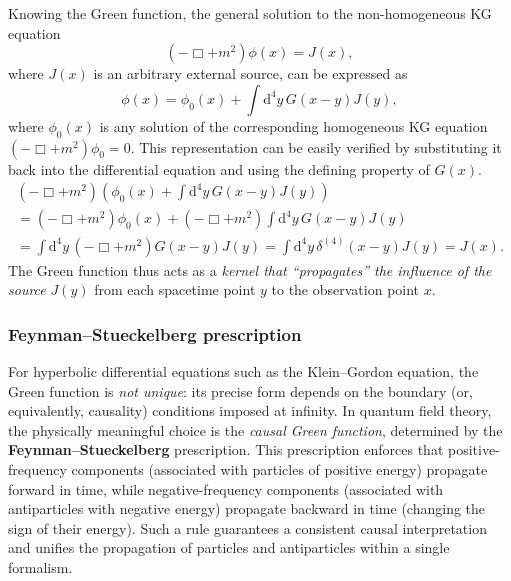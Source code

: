 Knowing the Green function, the general solution to the non-homogeneous KG equation
\begin{equation}
    (-\Box + m^2)\phi(x) = J(x),
    \label{eq:KG_inhomogeneous}
\end{equation}
where \(J(x)\) is an arbitrary external source, can be expressed as
\begin{equation}
    \phi(x) = \phi_0(x) + \int \mathrm{d}^4 y \, G(x - y) J(y),
    \label{eq:KG_solution_GF}
\end{equation}
where \(\phi_0(x)\) is any solution of the corresponding homogeneous KG equation \((-\Box + m^2)\phi_0 = 0\).
This representation can be easily verified by substituting it back into the differential equation and using the defining property of \(G(x)\).
\[
    \begin{aligned}
        (-\Box + m^2)\left( \phi_0(x) + \int \mathrm{d}^4 y \, G(x - y) J(y) \right) \\ =(-\Box + m^2)\phi_0(x) + (-\Box + m^2)\int \mathrm{d}^4 y \, G(x - y) J(y) \\
        = \int \mathrm{d}^4 y \, (-\Box + m^2) G(x - y) J(y) = \int \mathrm{d}^4 y \, \delta^{(4)}(x - y) J(y) = J(x).
    \end{aligned}
\]
The Green function thus acts as a \textit{kernel that ``propagates'' the influence of the source} \(J(y)\) from each spacetime point \(y\) to the observation point \(x\).

\subsubsection{Feynman--Stueckelberg prescription}

For hyperbolic differential equations such as the Klein--Gordon equation, the Green function is \textit{not unique}: its precise form depends on the boundary (or, equivalently, causality) conditions imposed at infinity.
In quantum field theory, the physically meaningful choice is the \textit{causal Green function}, determined by the \textbf{Feynman--Stueckelberg} prescription.
This prescription enforces that positive-frequency components (associated with particles of positive energy) propagate forward in time, while negative-frequency components (associated with antiparticles with negative energy) propagate backward in time (changing the sign of their energy).
Such a rule guarantees a consistent causal interpretation and unifies the propagation of particles and antiparticles within a single formalism.

